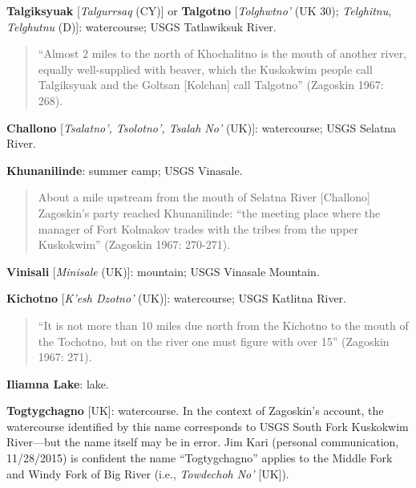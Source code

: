 \begin{hang}
\textbf{Talgiksyuak} [\textit{Talgurrsaq} (CY)] or \textbf{Talgotno} [\textit{Tolghwtno’} (UK 30); \textit{Telghitnu}, \textit{Telghutnu} (D)]: watercourse; USGS Tatlawiksuk River.



\begin{quote}“Almost 2 miles to the north of Khochalitno is the mouth of another river, equally well-supplied with beaver, which the Kuskokwim people call Talgiksyuak and the Goltsan [Kolchan] call Talgotno” (Zagoskin 1967: 268).
\end{quote}



\textbf{Challono} [\textit{Tsalatno’, Tsolotno’, Tsalah No’} (UK)]: watercourse; USGS Selatna River.



\textbf{Khunanilinde}: summer camp; USGS Vinasale.



\begin{quote}About a mile upstream from the mouth of Selatna River [Challono] Zagoskin’s party reached Khunanilinde: “the meeting place where the manager of Fort Kolmakov trades with the tribes from the upper Kuskokwim” (Zagoskin 1967: 270-271).
\end{quote}



\textbf{Vinisali} [\textit{Minisale} (UK)]: mountain; USGS Vinasale Mountain.



\textbf{Kichotno} [\textit{K’esh Dzotno’} (UK)]: watercourse; USGS Katlitna River.



\begin{quote}“It is not more than 10 miles due north from the Kichotno to the mouth of the Tochotno, but on the river one must figure with over 15” (Zagoskin 1967: 271).
\end{quote}



\textbf{Iliamna Lake}: lake.



\textbf{Togtygchagno} [UK]: watercourse. In the context of Zagoskin’s account, the watercourse identified by this name corresponds to USGS South Fork Kuskokwim River—but the name itself may be in error. Jim Kari (personal communication, 11/28/2015) is confident the name “Togtygchagno” applies to the Middle Fork and Windy Fork of Big River (i.e., \textit{Towdechoh No’} [UK]).




\end{hang}
